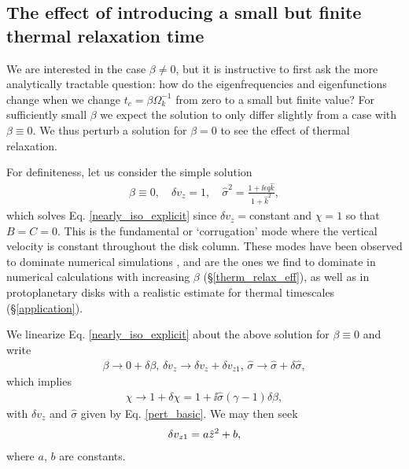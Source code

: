 \subsection{The effect of introducing a small but finite
  thermal relaxation time}\label{relax_pert}
We are interested in the case $\beta\neq 0$, but it is instructive to
first ask  the more analytically tractable question: how 
do the eigenfrequencies and eigenfunctions change when we change
$t_c=\beta\Omega_k^{-1}$ from zero to a small but finite value? For 
sufficiently small $\beta$ we expect the solution to only differ
slightly from a case with $\beta\equiv 0$. We thus perturb a solution
for $\beta=0$ to see the effect of thermal relaxation.  

For definiteness, let us consider the simple solution 
\begin{align}
  \beta\equiv 0, \quad \delta v_z = 1,\quad \hat{\sigma}^2 = \frac{1 +
  \ii\epsilon q \hat{k}}{1+\hat{k}^2}, \label{pert_basic} 
\end{align}
which solves Eq. \ref{nearly_iso_explicit} since $\delta
v_z=$constant and $\chi=1$ so that $B=C=0$. 
This is the fundamental or `corrugation' mode where the vertical
velocity is constant throughout the disk column. These modes have been
observed to dominate numerical simulations \citep{nelson13,stoll14},  
and are the ones we find to dominate in numerical calculations with 
increasing $\beta$ (\S\ref{therm_relax_eff}), as well as in protoplanetary disks 
with a realistic estimate for thermal timescales
(\S\ref{application}).  

We linearize Eq. \ref{nearly_iso_explicit} about the above
solution for $\beta\equiv0$ and write 
\begin{align}\label{nearly_iso_pert}
  \beta \to 0 + \delta\beta,\, \delta v_z\to \delta v_z+\delta
  v_{z1},\,\hat{\sigma} \to \hat{\sigma} + \delta\hat{\sigma}, 
\end{align}
which implies 
\begin{align}
  \chi \to 1 + \delta\chi = 1 + \ii \hat{\sigma}\left(\gamma-1\right)\delta\beta,
\end{align}
with $\delta v_z$ and $\hat{\sigma}$ given by Eq. \ref{pert_basic}. We
may then seek  
\begin{align}
  \delta v_{z1} = a \hat{z}^2 + b,
\end{align}
where $a$, $b$ are constants. 

